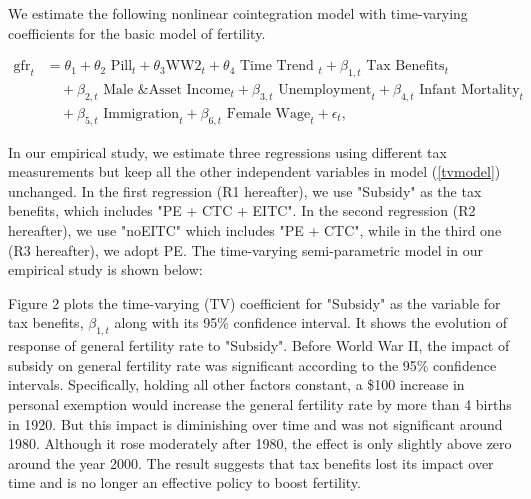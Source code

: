 \documentclass[12pt,a4paper]{article}
\begin{document}
We estimate the following nonlinear cointegration model with time-varying coefficients for the basic model of fertility.


\begin{equation}
\begin{aligned}
\text{gfr}_{t} &= \theta_{1}+\theta_{2} \text { Pill}_{t}+\theta_{3} \mathrm { WW2}_{t}+\theta_{4} \text { Time Trend }_{t} + \beta_{1,t} \text { Tax Benefits}_{t} \\ & \quad +\beta_{2,t} \text { Male \& Asset Income}_{t}  +\beta_{3,t} \text { Unemployment}_{t}+ \beta_{4,t} \text { Infant Mortality}_{t} \\ & \quad +\beta_{5,t} \text { Immigration}_{t} +\beta_{6,t} \text { Female Wage}_{t}+\epsilon_{t}, \label{tvmodel}
\end{aligned}
\end{equation}


In our empirical study, we estimate three regressions using different tax measurements but keep all the other independent variables in model (\ref{tvmodel}) unchanged. In the first regression (R1 hereafter), we use "Subsidy" as the tax benefits, which includes "PE + CTC + EITC". In the second regression (R2 hereafter), we use "noEITC" which includes "PE + CTC", while in the third one (R3 hereafter), we adopt PE. The time-varying semi-parametric model in our empirical study is shown below:

Figure 2 plots the time-varying (TV) coefficient for "Subsidy" as the variable for tax benefits, $\beta_{1,t}$ along with its 95\% confidence interval. It shows the evolution of response of general fertility rate to "Subsidy". Before World War II, the impact of subsidy on general fertility rate was significant according to the 95\% confidence intervals. Specifically, holding all other factors constant, a \$100 increase in personal exemption would increase the general fertility rate by more than 4 births in 1920. But this impact is diminishing over time and was not significant around 1980. Although it rose moderately after 1980, the effect is only slightly above zero around the year 2000. The result suggests that tax benefits lost its impact over time and is no longer an effective policy to boost fertility. 
\end{document}
